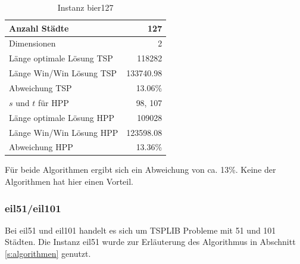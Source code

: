 \documentclass[11pt,a4paper]{article}
\begin{document}
        \begin{table}[H]
                \centering
                \begin{tabular}{| l | r |}
                    \hline
                        Anzahl Städte               & 127           \\ \hline
                        Dimensionen                 & 2             \\ \hline
                        Länge optimale Lösung TSP   & 118282        \\ \hline
                        Länge Win/Win Lösung  TSP   & 133740.98     \\ \hline
                        Abweichung TSP              & 13.06\%       \\ \hline
                        $s$ und $t$ für HPP         & 98, 107       \\ \hline
                        Länge optimale Lösung HPP   & 109028        \\ \hline
                        Länge Win/Win Lösung  HPP   & 123598.08     \\ \hline
                        Abweichung HPP              & 13.36\%       \\ \hline
                \end{tabular}
                \caption{Instanz bier127}
                \label{tab:bier127}
        \end{table}

Für beide Algorithmen ergibt sich ein Abweichung von ca. 13\%. Keine der Algorithmen hat hier einen Vorteil.

\subsubsection{eil51/eil101}
Bei eil51 und eil101 handelt es sich um TSPLIB Probleme mit 51 und 101 Städten. Die Instanz eil51 wurde zur Erläuterung des Algorithmus in Abschnitt \ref{s:algorithmen} genutzt.
\end{document}
